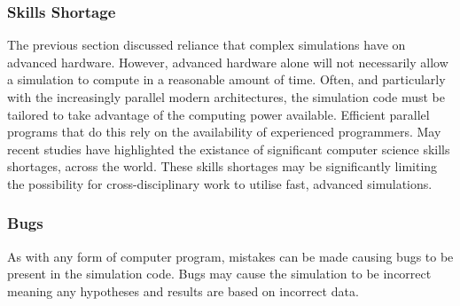 \documentclass{UoYCSproject}
\begin{document}


\subsubsection{Skills Shortage}
\label{skills_shortage}
The previous section discussed reliance that complex simulations have on advanced hardware. However, advanced hardware alone will not necessarily allow a simulation to compute in a reasonable amount of time. 
Often, and particularly with the increasingly parallel modern architectures, the simulation code must be tailored to take advantage of the computing power available. Efficient parallel programs that do this rely on the availability of experienced programmers. May recent studies have highlighted the existance of significant computer science skills shortages, across the world\cite{digital_skills_uk, microsoft_blog}. These skills shortages may be significantly limiting the possibility for cross-disciplinary work to utilise fast, advanced simulations.




\subsubsection{Bugs}
As with any form of computer program, mistakes can be made causing bugs to be present in the simulation code. Bugs may cause the simulation to be incorrect meaning any hypotheses and results are based on incorrect data.
\end{document}

